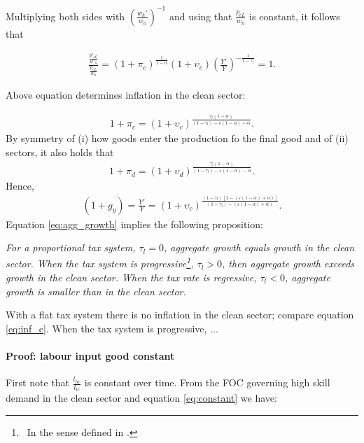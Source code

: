 Multiplying both sides with $\left(\frac{w_h'}{w_h}\right)^{-1}$ and using that $\frac{p_{cL}}{w_h}$ is constant, it follows that 

\begin{align}
		\frac{\frac{p'_{cL}}{w'_h}}{\frac{p_{cL}}{w_h}}= (1+\pi_c)^\frac{1}{1-\alpha}(1+\upsilon_{c})\left(\frac{Y'}{Y}\right)^{-\frac{1}{1-\tau_l}}=1.
\end{align}

Above equation determines inflation in the clean sector:

\begin{align}\label{eq:inf_c}
1+\pi_c=(1+\upsilon_{c})^{\frac{\tau_l(1-\alpha)}{(1-\tau_l)-\varepsilon(1-\alpha)-\alpha}}.
\end{align}
By symmetry of (i) how goods enter the production fo the final good and of (ii) sectors, it also holds that 
\begin{align}\label{eq:inf_d}
1+\pi_d=(1+\upsilon_{d})^{\frac{\tau_l(1-\alpha)}{(1-\tau_l)-\varepsilon(1-\alpha)-\alpha}}.
\end{align}
Hence, 
\begin{align}\label{eq:agg_growth}
	(1+g_y)=\frac{Y'}{Y}=(1+\upsilon_{c})^\frac{(1-\tau_l)[1-(\varepsilon(1-\alpha)+\alpha)]}{(1-\tau_l)-(\varepsilon(1-\alpha)+\alpha)}.
\end{align}
Equation \ref{eq:agg_growth} implies the following proposition:
\begin{prop}
\textit{For a proportional tax system, $\tau_l=0$, aggregate growth equals growth in the clean sector. 
When the tax system is progressive\footnote{\ In the sense defined in \cite{Heathcote2017OptimalFramework}.}, $\tau_l>0$, then aggregate growth exceeds growth in the clean sector. When the tax rate is regressive, $\tau_l<0$, aggregate growth is smaller than in the clean sector. }
\end{prop}
With a flat tax system there is no inflation in the clean sector; compare equation \ref{eq:inf_c}. When the tax system is progressive, ...

\paragraph{Proof: labour input good constant}

First note that $\frac{l_{hc}}{l_{lc}}$ is constant over time. 
From the FOC governing high skill demand in the clean sector and equation \ref{eq:constant} we have:

